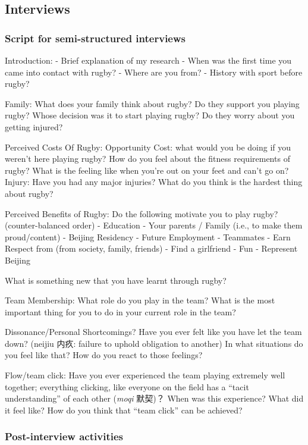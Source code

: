 \begin{CJK}{UTF8}{gbsn}
\subsection{Interviews}
  \subsubsection{Script for semi-structured interviews \label{sect:semiStructured}}


Introduction:
- Brief explanation of my research
- When was the first time you came into contact with rugby?
- Where are you from?
- History with sport before rugby?

Family:
What does your family think about rugby?
Do they support you playing rugby?
Whose decision was it to start playing rugby?
Do they worry about you getting injured?

Perceived Costs Of Rugby:
Opportunity Cost: what would you be doing if you weren’t here playing rugby?
How do you feel about the fitness requirements of rugby?
What is the feeling like when you’re out on your feet and can’t go on?
Injury: Have you had any major injuries?
What do you think is the hardest thing about rugby?

Perceived Benefits of Rugby:
Do the following motivate you to play rugby? (counter-balanced order)
- Education
- Your parents / Family (i.e., to make them proud/content)
- Beijing Residency
- Future Employment
- Teammates
- Earn Respect from (from society, family, friends)
- Find a girlfriend
- Fun
- Represent Beijing

What is something new that you have learnt through rugby?

Team Membership:
What role do you play in the team?
What is the most important thing for you to do in your current role in the team?

Dissonance/Personal Shortcomings?
Have you ever felt like you have let the team down?  (neijiu 内疚: failure to uphold obligation to another)
In what situations do you feel like that?
How do you react to those feelings?

Flow/team click:
Have you ever experienced the team playing extremely well together; everything clicking, like everyone on the field has a “tacit understanding” of each other (\textit{moqi} 默契)？
When was this experience?
What did it feel like?
How do you think that “team click” can be achieved?


\subsubsection{Post-interview activities\label{sect:postInterview}}



\end{CJK}
